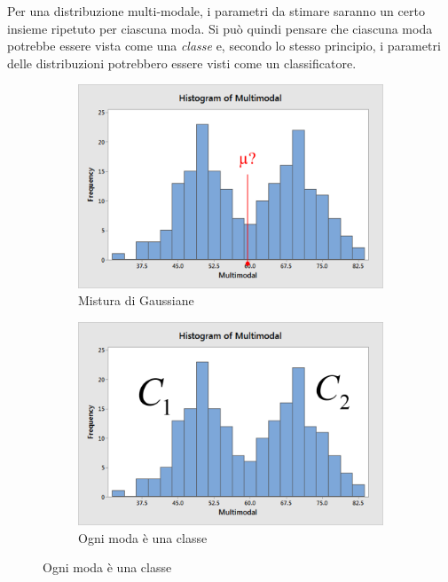 \documentclass[a4paper,oneside,titlepage]{book}
\begin{document}
Per una distribuzione multi-modale, i parametri da stimare saranno un certo insieme ripetuto per ciascuna moda. Si può quindi pensare che ciascuna moda potrebbe essere vista come una \textit{classe} e, secondo lo stesso principio, i parametri delle distribuzioni potrebbero essere visti come un classificatore.
\begin{figure}[htp]
	\begin{subfigure}{0.49\textwidth}
	    \centering
		\includegraphics[width=\textwidth, height=\textheight, keepaspectratio]{multimodal1.png}
		\caption{Mistura di Gaussiane}
	\end{subfigure}
	\hfill
	\begin{subfigure}{0.49\textwidth}
	    \centering
		\includegraphics[width=\textwidth, height=\textheight, keepaspectratio]{multimodal2.png}
		\caption{Ogni moda è una classe}
	\end{subfigure}
\end{figure}
\end{document}
